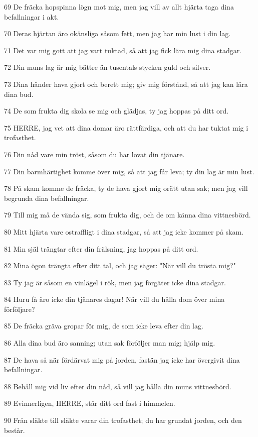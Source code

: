 \par 69 De fräcka hopspinna lögn mot mig, men jag vill av allt hjärta taga dina befallningar i akt.
\par 70 Deras hjärtan äro okänsliga såsom fett, men jag har min lust i din lag.
\par 71 Det var mig gott att jag vart tuktad, så att jag fick lära mig dina stadgar.
\par 72 Din muns lag är mig bättre än tusentals stycken guld och silver.
\par 73 Dina händer hava gjort och berett mig; giv mig förstånd, så att jag kan lära dina bud.
\par 74 De som frukta dig skola se mig och glädjas, ty jag hoppas på ditt ord.
\par 75 HERRE, jag vet att dina domar äro rättfärdiga, och att du har tuktat mig i trofasthet.
\par 76 Din nåd vare min tröst, såsom du har lovat din tjänare.
\par 77 Din barmhärtighet komme över mig, så att jag får leva; ty din lag är min lust.
\par 78 På skam komme de fräcka, ty de hava gjort mig orätt utan sak; men jag vill begrunda dina befallningar.
\par 79 Till mig må de vända sig, som frukta dig, och de om känna dina vittnesbörd.
\par 80 Mitt hjärta vare ostraffligt i dina stadgar, så att jag icke kommer på skam.
\par 81 Min själ trängtar efter din frälsning, jag hoppas på ditt ord.
\par 82 Mina ögon trängta efter ditt tal, och jag säger: "När vill du trösta mig?"
\par 83 Ty jag är såsom en vinlägel i rök, men jag förgäter icke dina stadgar.
\par 84 Huru få äro icke din tjänares dagar! När vill du hålla dom över mina förföljare?
\par 85 De fräcka gräva gropar för mig, de som icke leva efter din lag.
\par 86 Alla dina bud äro sanning; utan sak förföljer man mig; hjälp mig.
\par 87 De hava så när fördärvat mig på jorden, fastän jag icke har övergivit dina befallningar.
\par 88 Behåll mig vid liv efter din nåd, så vill jag hålla din muns vittnesbörd.
\par 89 Evinnerligen, HERRE, står ditt ord fast i himmelen.
\par 90 Från släkte till släkte varar din trofasthet; du har grundat jorden, och den består.
